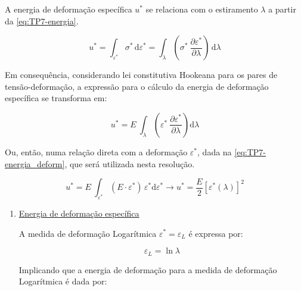 \begin{textocaixa}
\hspace{10mm}

A energia de deformação específica $u^*$ se relaciona com o estiramento $\lambda$ a partir
da \autoref{eq:TP7-energia}.

\begin{equation}
    u^* = \int_{\varepsilon^*}\sigma^*\,\mathrm{d}\varepsilon^*
        = \int_\lambda \left(\sigma^*\:\frac{\partial \varepsilon^*}
                                            {\partial \lambda}\right)\,\mathrm{d}\lambda
    \label{eq:TP7-energia}
\end{equation}

Em consequência, considerando lei constitutiva Hookeana para os pares de tensão-deformação,
a expressão para o cálculo da energia de deformação específica se transforma em:

\begin{equation}
    u^* = E\:\int_\lambda \left(\varepsilon^*\:
                                \frac{\partial \varepsilon^*}
                                     {\partial \lambda}\right) \mathrm{d}\lambda
    \label{eq:TP7-energia_estiramento}
\end{equation}

Ou, então, numa relação direta com a deformação $\varepsilon^*$, dada na
\autoref{eq:TP7-energia_deform}, que será utilizada nesta resolução.

\begin{equation}
    u^* = E\:\int_{\varepsilon^*} \left(E\cdot\varepsilon^*\right)
                                      \,\varepsilon^* \mathrm{d}\varepsilon^*
    \longrightarrow \boxed{u^* = \frac{E}{2}\left[\varepsilon^*\left(\lambda\right)\right]^2}
    \label{eq:TP7-energia_deform}
\end{equation}

\begin{enumerate}
    \item \underline{Energia de deformação específica}

A medida de deformação Logarítmica $\varepsilon^* = \varepsilon_L$ é expressa por:

\begin{equation}
    \varepsilon_L = \ln \lambda
    \label{eq:TP7-eL}
\end{equation}

Implicando que a energia de deformação para a medida de deformação Logarítmica é dada por:


\end{enumerate}
\end{textocaixa}
